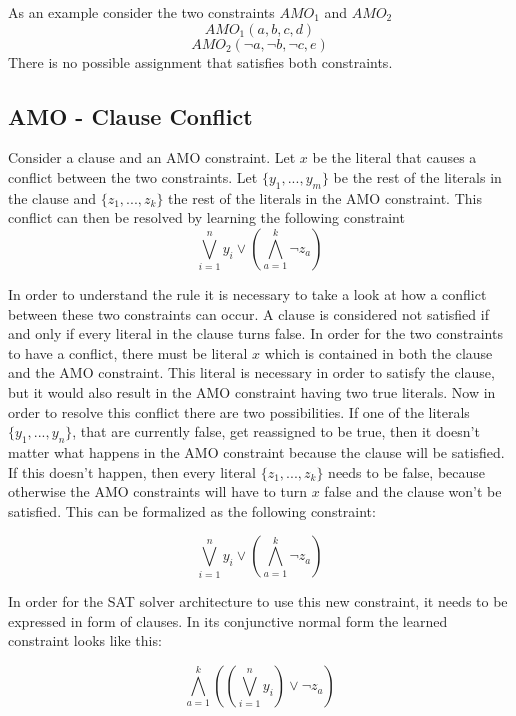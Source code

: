 As an example consider the two constraints $AMO_1$ and $AMO_2$
\begin{displaymath}
AMO_1(a,b,c,d)
\end{displaymath}
\begin{displaymath}
AMO_2(\neg a, \neg b, \neg c, e)
\end{displaymath}
There is no possible assignment that satisfies both constraints.

\subsection{AMO - Clause Conflict}

\begin{leftbar}
Consider a clause and an AMO constraint. Let $x$ be the literal that causes a conflict between the two constraints. Let $\{y_1,...,y_m\}$ be the rest of the literals in the clause and $\{z_1,...,z_k\}$ the rest of the literals in the AMO constraint.
This conflict can then be resolved by learning the following constraint
\begin{displaymath}
\bigvee_{i=1}^{n}y_i \vee (\bigwedge_{a=1}^{k}\neg z_a)
\end{displaymath}

\end{leftbar}

In order to understand the rule it is necessary to take a look at how a conflict between these two constraints can occur. A clause is considered not satisfied if and only if every literal in the clause turns false. In order for the two constraints to have a conflict, there must be literal $x$ which is contained in both the clause and the AMO constraint. This literal is necessary in order to satisfy the clause, but it would also result in the AMO constraint having two true literals. Now in order to resolve this conflict there are two possibilities. If one of the literals $\{y_1,...,y_n\}$, that are currently false, get reassigned to be true, then it doesn't matter what happens in the AMO constraint because the clause will be satisfied. If this doesn't happen, then every literal $\{z_1,...,z_k\}$ needs to be false, because otherwise the AMO constraints will have to turn $x$ false and the clause won't be satisfied. This can be formalized as the following constraint:
\begin{leftbar}
\begin{displaymath}
\bigvee_{i=1}^{n}y_i \vee (\bigwedge_{a=1}^{k}\neg z_a)
\end{displaymath}
\end{leftbar}
In order for the SAT solver architecture to use this new constraint, it needs to be expressed in form of clauses. In its conjunctive normal form the learned constraint looks like this:
\begin{leftbar}
\begin{displaymath}
\bigwedge_{a=1}^{k}((\bigvee_{i=1}^{n}y_i)\vee \neg z_a)
\end{displaymath}
\end{leftbar}

